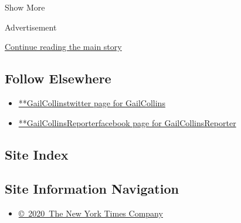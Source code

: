 Show More

Advertisement

\protect\hyperlink{after-mid2}{Continue reading the main story}

\hypertarget{follow-elsewhere}{%
\subsection{Follow Elsewhere}\label{follow-elsewhere}}

\begin{itemize}
\tightlist
\item
  \href{https://twitter.com/GailCollins}{**GailCollinstwitter page for
  GailCollins}
\item
  \href{https://www.facebookcorewwwi.onion/GailCollinsReporter}{**GailCollinsReporterfacebook
  page for GailCollinsReporter}
\end{itemize}

\hypertarget{site-index}{%
\subsection{Site Index}\label{site-index}}

\hypertarget{site-information-navigation}{%
\subsection{Site Information
Navigation}\label{site-information-navigation}}

\begin{itemize}
\tightlist
\item
  \href{https://help.nytimes3xbfgragh.onion/hc/en-us/articles/115014792127-Copyright-notice}{©~2020~The
  New York Times Company}
\end{itemize}

